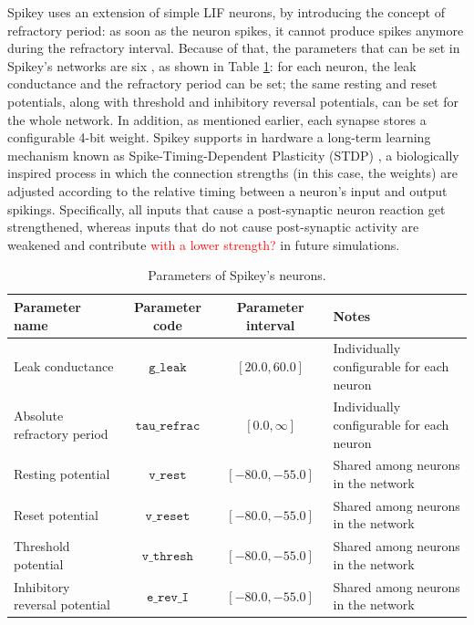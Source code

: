 \documentclass[utf8]{frontiersFPHY} %
\begin{document}
Spikey uses an extension of simple LIF neurons, by introducing the concept  of refractory period: as soon as the neuron spikes, it cannot produce  spikes anymore during the refractory interval. 
Because of that, 
the parameters that can be set in Spikey's networks are six \cite{Pfeil2013}, as shown in Table \ref{tab:parameters}: for each neuron, the leak conductance and the refractory period can be set; the same resting and reset potentials, along with threshold and inhibitory reversal potentials, can be set for the whole network. 
In addition, as mentioned earlier, each synapse stores a configurable 4-bit weight.
Spikey supports in hardware a long-term learning mechanism known as Spike-Timing-Dependent Plasticity (STDP) \cite{schemmel2006implementing}, a biologically inspired process in which the connection strengths (in this case, the weights) are adjusted according to the relative timing between a neuron's input and output spikings.
Specifically, all inputs that cause a post-synaptic neuron reaction get strengthened, whereas inputs that do not cause post-synaptic activity are weakened and contribute \textcolor{red}{with a lower strength?} in future simulations.

\begin{table}[htbp]
	\caption{Parameters of Spikey's neurons.}

	\label{tab:parameters}

	\centering
	\small
	\begin{tabular}{l|c|c|l}
	\hline
	\textbf{Parameter name}  & \textbf{Parameter code} & \textbf{Parameter interval} & \textbf{Notes} \\
	\hline
	\hline
		Leak conductance	 & $\texttt{g\_leak}$ &  $[20.0, 60.0]$ & Individually configurable for each neuron \\
	\hline
		Absolute refractory period	 & $\texttt{tau\_refrac}$ &  $[0.0, \infty]$ & Individually configurable for each neuron \\
	\hline
		Resting potential 	&  $\texttt{v\_rest}$ & 	$[-80.0, -55.0]$ &	Shared among neurons in the network\\
	\hline
		Reset potential 	&  $\texttt{v\_reset}$ & 	$[-80.0, -55.0]$ &	Shared among neurons in the network\\
	\hline
		Threshold potential 	&  $\texttt{v\_thresh}$ & 	$[-80.0, -55.0]$ &	Shared among neurons in the network\\
	\hline
		Inhibitory reversal potential 	&  $\texttt{e\_rev\_I}$ & $[-80.0, -55.0]$ &	Shared among neurons in the network\\
	\hline

	\end{tabular}
\end{table}
\end{document}
